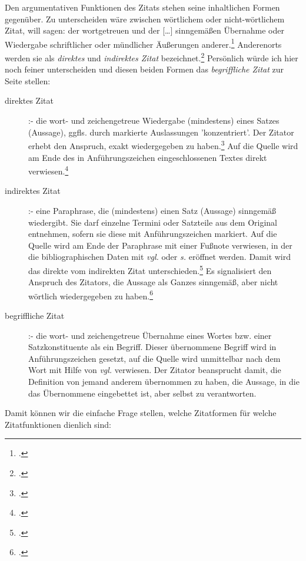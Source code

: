 Den argumentativen Funktionen des Zitats stehen seine inhaltlichen Formen gegenüber. Zu unterscheiden wäre zwischen \glqq{}wörtlichem\grqq{} oder \glqq{}nicht-wörtlichem\grqq{} Zitat, will sagen: der wortgetreuen und der \glqq{}[\ldots] sinngemäßen Übernahme oder Wiedergabe schriftlicher oder mündlicher Äußerungen anderer\grqq{}.\footcite[vgl.][S. 187f - ohne Frage, dieses ist ein sinngemäßes und kein wörtliches Zitat. Und es ist affirmativ]{RueStaFra1980a} Anderenorts werden sie als \emph{direktes} und \emph{indirektes Zitat} bezeichnet.\footcite[vgl.][]{WisArbOrgZitate} Persönlich würde ich hier noch feiner unterscheiden und diesen beiden Formen das \emph{begriffliche Zitat} zur Seite stellen:

\begin{description}
  \item[direktes Zitat] :- die wort- und zeichengetreue Wiedergabe (mindestens) eines Satzes (Aussage), ggfls. durch markierte Auslassungen 'konzentriert'. Der Zitator erhebt den Anspruch, exakt wiedergegeben zu haben.\footcite[vgl.][187f]{RueStaFra1980a} Auf die Quelle wird am Ende des in Anführungszeichen eingeschlossenen Textes direkt verwiesen.\footcite[vgl.][172]{Theisen2013a}
  \item[indirektes Zitat] :- eine Paraphrase, die (mindestens) einen Satz (Aussage) sinngemäß wiedergibt. Sie darf einzelne Termini oder Satzteile aus dem Original entnehmen, sofern sie diese mit Anführungszeichen markiert. Auf die Quelle wird am Ende der Paraphrase mit einer Fußnote verwiesen, in der die bibliographischen Daten mit \emph{vgl.} oder \emph{s.} eröffnet werden. Damit wird das direkte vom indirekten Zitat unterschieden.\footcite[vgl.][174]{Theisen2013a} Es signalisiert den Anspruch des Zitators, die Aussage als Ganzes sinngemäß, aber nicht wörtlich wiedergegeben zu haben.\footcite[vgl.][letzter Absatz aus Abschnitt 'Grenzen der Zitierpflicht']{Wikipedia2011a}
  \item[begriffliche Zitat] :- die wort- und zeichengetreue Übernahme eines Wortes bzw. einer Satzkonstituente als ein Begriff. Dieser übernommene Begriff wird in Anführungszeichen gesetzt, auf die Quelle wird unmittelbar nach dem Wort mit Hilfe von {\itshape vgl.} verwiesen. Der Zitator beansprucht damit, die Definition von jemand anderem übernommen zu haben, die Aussage, in die das Übernommene eingebettet ist, aber selbst zu verantworten.
\end{description}

Damit können wir die einfache Frage stellen, welche Zitatformen für welche
Zitatfunktionen dienlich sind:

